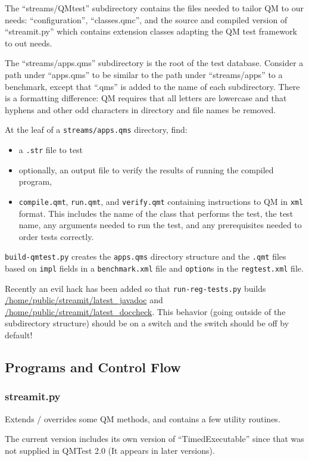\documentclass[11pt]{article}
\begin{document}
The ``streams/QMtest'' subdirectory contains the files needed to
tailor QM to our needs:  ``configuration'', ``classes.qmc'', and the
source and compiled version of ``streamit.py'' which contains extension
classes adapting the QM test framework to out needs.

The ``streams/apps.qms'' subdirectory is the root of the test
database.  Consider a path under ``apps.qms'' to be similar to the
path under ``streams/apps'' to a benchmark, except that ``.qms'' is
added to the name of each subdirectory.  There is a formatting
difference: QM requires that all letters are lowercase and that
hyphens and other odd characters in directory and file names be
removed.

At the leaf of a  {\tt streams/apps.qms} directory, find: 
\begin{itemize}
\item a {\tt .str} file to test
\item optionally, an output file to verify the results of running the 
compiled program,
\item {\tt compile.qmt}, {\tt run.qmt}, and {\tt verify.qmt}
containing instructions to QM in {\tt xml} format.
This includes the name of the class that performs the test, the test
name, any arguments needed to run the test, and any prerequisites
needed to order tests correctly.
\end{itemize}
{\tt build-qmtest.py} creates the {\tt apps.qms} directory structure and
the {\tt .qmt} files based on {\tt impl} fields in a {\tt benchmark.xml}
file and {\tt option}s in the {\tt regtest.xml} file.

Recently an evil hack has been added so that {\tt run-reg-tests.py} builds 
\url{/home/public/streamit/latest\_javadoc} and \url{/home/public/streamit/latest\_doccheck}.
This behavior (going outside of the subdirectory structure) should be on a switch
and the switch should be off by default!

\subsection{Programs and Control Flow}

\subsubsection{streamit.py}
Extends / overrides some QM methods, and contains a few utility routines.

The current version includes its own version of ``TimedExecutable''
since that was not supplied in QMTest 2.0 (It appears in later
versions).  
\end{document}
